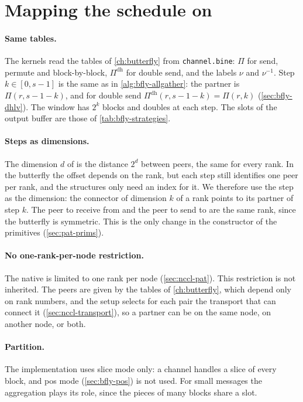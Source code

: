 \section{Mapping the schedule on \pat{}}\label{sec:pat-mapping}

\paragraph{Same tables.}
The kernels read the tables of \cref{ch:butterfly} from \texttt{channel.bine}: $\Pi$ for send, permute and block-by-block, $\Pi^{\mathrm{dh}}$ for double send, and the labels $\nu$ and $\nu^{-1}$.
Step $k\in[0,s-1]$ is the same as in \cref{alg:bfly-allgather}: the partner is $\Pi(r,s-1-k)$, and for double send $\Pi^{\mathrm{dh}}(r,s-1-k)=\Pi(r,k)$ (\cref{sec:bfly-dhlv}).
The window has $2^k$ blocks and doubles at each step. The slots of the output buffer are those of \cref{tab:bfly-strategies}.

\paragraph{Steps as dimensions.}
The dimension $d$ of \pat{} is the distance $2^d$ between peers, the same for every rank.
In the \bine{} butterfly the offset depends on the rank, but each step still identifies one peer per rank, and the \pat{} structures only need an index for it.
We therefore use the step as the dimension: the connector of dimension $k$ of a rank points to its partner of step $k$.
The peer to receive from and the peer to send to are the same rank, since the butterfly is symmetric. This is the only change in the constructor of the primitives (\cref{sec:pat-prims}).

\paragraph{No one-rank-per-node restriction.}
The native \pat{} is limited to one rank per node (\cref{sec:nccl-pat}). This restriction is not inherited.
The peers are given by the tables of \cref{ch:butterfly}, which depend only on rank numbers, and the \bine{} setup selects for each pair the transport that can connect it (\cref{sec:nccl-transport}), so a partner can be on the same node, on another node, or both.

\paragraph{Partition.}
The implementation uses slice mode only: a channel handles a slice of every block, and pos mode (\cref{sec:bfly-pos}) is not used.
For small messages the aggregation plays its role, since the pieces of many blocks share a slot.


